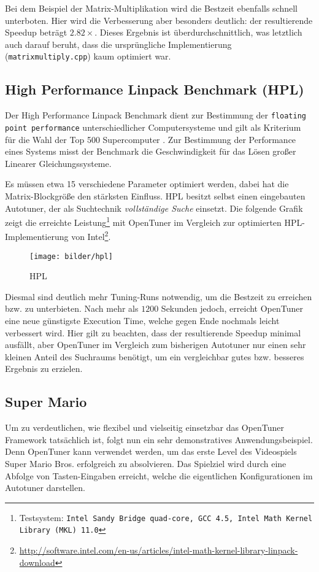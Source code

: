 \documentclass[a4paper,11pt]{scrartcl}
\newcommand{\bzw}{\mbox{bzw.}\xspace}
\begin{document}
Bei dem Beispiel der Matrix-Multiplikation wird die Bestzeit ebenfalls schnell unterboten.
Hier wird die Verbesserung aber besonders deutlich: der resultierende Speedup beträgt
$2.82 \times$. Dieses Ergebnis ist überdurchschnittlich, was letztlich auch darauf beruht,
dass die ursprüngliche Implementierung (\texttt{matrixmultiply.cpp}) kaum optimiert war.

\subsection{High Performance Linpack Benchmark (HPL)}
Der High Performance Linpack Benchmark \cite{hpl} dient zur Bestimmung der 
\texttt{floating point performance} unterschiedlicher Computersysteme und gilt als 
Kriterium für die Wahl der Top 500 Supercomputer \cite{top500}.
Zur Bestimmung der Performance eines Systems misst der Benchmark die Geschwindigkeit 
für das Lösen großer Linearer Gleichungssysteme. \newline

Es müssen etwa 15 verschiedene Parameter
optimiert werden, dabei hat die Matrix-Blockgröße den stärksten Einfluss.
HPL besitzt selbst einen eingebauten Autotuner, der als Suchtechnik 
\emph{vollständige Suche} einsetzt. Die folgende Grafik zeigt die erreichte Leistung\footnote{
Testsystem: \texttt{Intel Sandy Bridge quad-core, GCC 4.5, Intel  Math  Kernel  Library  (MKL)  11.0}}
mit OpenTuner im Vergleich zur optimierten HPL-Implementierung von Intel\footnote{\url{http://software.intel.com/en-us/articles/intel-math-kernel-library-linpack-download}}. \newline


\begin{figure}[h]
\begin{center}
\texttt{[image: bilder/hpl]}
\cite{OT-paper} \caption{HPL}
\end{center}
\end{figure}

Diesmal sind deutlich mehr Tuning-Runs notwendig, um die Bestzeit zu erreichen \bzw zu unterbieten.
Nach mehr als $1200$ Sekunden jedoch, erreicht OpenTuner eine neue günstigste Execution Time,
welche gegen Ende nochmals leicht verbessert wird. Hier gilt zu beachten, dass der resultierende
Speedup minimal ausfällt, aber OpenTuner im Vergleich zum bisherigen Autotuner nur einen 
sehr kleinen Anteil des Suchraums benötigt, um ein vergleichbar gutes \bzw besseres Ergebnis 
zu erzielen.

\subsection{Super Mario}
Um zu verdeutlichen, wie flexibel und vielseitig einsetzbar das OpenTuner Framework tatsächlich ist,
folgt nun ein sehr demonstratives Anwendungsbeispiel. Denn OpenTuner kann verwendet werden,
um das erste Level des Videospiels Super Mario Bros. erfolgreich zu absolvieren.
Das Spielziel wird durch eine Abfolge von Tasten-Eingaben erreicht, welche die eigentlichen
Konfigurationen im Autotuner darstellen. \newline
\end{document}
